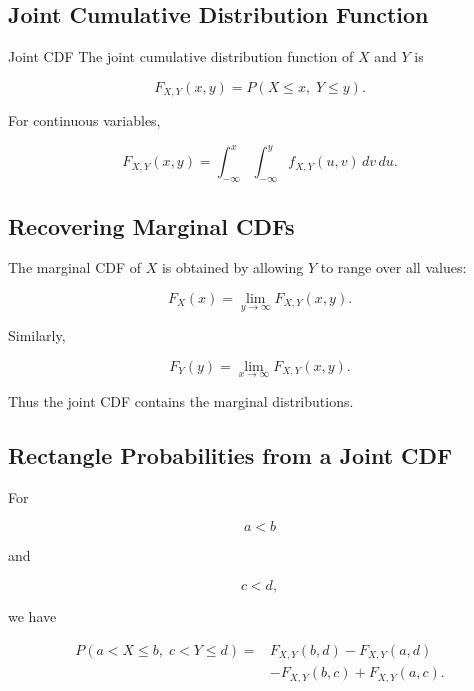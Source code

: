 \subsection{Joint Cumulative Distribution Function}
\label{subsec:joint-cdf}

\begin{definitionbox}{Joint CDF}
The joint cumulative distribution function of \(X\) and \(Y\) is

\[
\boxed{
F_{X,Y}(x,y)
=
P(X\leq x,\;Y\leq y).
}
\]
\end{definitionbox}

For continuous variables,

\[
\boxed{
F_{X,Y}(x,y)
=
\int_{-\infty}^{x}
\int_{-\infty}^{y}
f_{X,Y}(u,v)\,dv\,du.
}
\]

\subsection{Recovering Marginal CDFs}
\label{subsec:marginals-from-joint-cdf}

The marginal CDF of \(X\) is obtained by allowing \(Y\) to range over all
values:

\[
\boxed{
F_X(x)
=
\lim_{y\to\infty}
F_{X,Y}(x,y).
}
\]

Similarly,

\[
\boxed{
F_Y(y)
=
\lim_{x\to\infty}
F_{X,Y}(x,y).
}
\]

Thus the joint CDF contains the marginal distributions.

\subsection{Rectangle Probabilities from a Joint CDF}
\label{subsec:rectangle-probabilities-joint-cdf}

For

\[
a<b
\]

and

\[
c<d,
\]

we have

\[
\boxed{
\begin{aligned}
P(a<X\leq b,\;c<Y\leq d)
={}&
F_{X,Y}(b,d)
-F_{X,Y}(a,d)
\\
&-
F_{X,Y}(b,c)
+
F_{X,Y}(a,c).
\end{aligned}
}
\]

